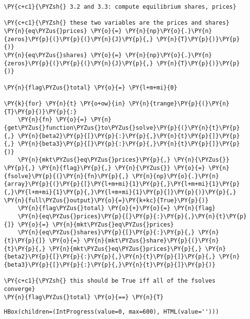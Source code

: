     \begin{tcolorbox}[breakable, size=fbox, boxrule=1pt, pad at break*=1mm,colback=cellbackground, colframe=cellborder]
\begin{Verbatim}[commandchars=\\\{\}]
\PY{c+c1}{\PYZsh{} 3.2 and 3.3: compute equilibrium shares, prices}

\PY{c+c1}{\PYZsh{} these two variables are the prices and shares}
\PY{n}{eq\PYZus{}prices} \PY{o}{=} \PY{n}{np}\PY{o}{.}\PY{n}{zeros}\PY{p}{(}\PY{p}{(}\PY{n}{J}\PY{p}{,} \PY{n}{T}\PY{p}{)}\PY{p}{)}
\PY{n}{eq\PYZus{}shares} \PY{o}{=} \PY{n}{np}\PY{o}{.}\PY{n}{zeros}\PY{p}{(}\PY{p}{(}\PY{n}{J}\PY{p}{,} \PY{n}{T}\PY{p}{)}\PY{p}{)}

\PY{n}{flag\PYZus{}total} \PY{o}{=} \PY{l+m+mi}{0}

\PY{k}{for} \PY{n}{t} \PY{o+ow}{in} \PY{n}{trange}\PY{p}{(}\PY{n}{T}\PY{p}{)}\PY{p}{:}
    \PY{n}{fn} \PY{o}{=} \PY{n}{get\PYZus{}function\PYZus{}to\PYZus{}solve}\PY{p}{(}\PY{n}{t}\PY{p}{,} \PY{n}{beta2}\PY{p}{[}\PY{p}{:}\PY{p}{,}\PY{n}{t}\PY{p}{]}\PY{p}{,} \PY{n}{beta3}\PY{p}{[}\PY{p}{:}\PY{p}{,}\PY{n}{t}\PY{p}{]}\PY{p}{)}
    \PY{n}{mkt\PYZus{}eq\PYZus{}prices}\PY{p}{,} \PY{n}{\PYZus{}} \PY{p}{,} \PY{n}{flag}\PY{p}{,} \PY{n}{\PYZus{}} \PY{o}{=} \PY{n}{fsolve}\PY{p}{(}\PY{n}{fn}\PY{p}{,} \PY{n}{np}\PY{o}{.}\PY{n}{array}\PY{p}{(}\PY{p}{[}\PY{l+m+mi}{1}\PY{p}{,}\PY{l+m+mi}{1}\PY{p}{,}\PY{l+m+mi}{1}\PY{p}{,}\PY{l+m+mi}{1}\PY{p}{]}\PY{p}{)}\PY{p}{,} \PY{n}{full\PYZus{}output}\PY{o}{=}\PY{k+kc}{True}\PY{p}{)}
    \PY{n}{flag\PYZus{}total} \PY{o}{+}\PY{o}{=} \PY{n}{flag}
    \PY{n}{eq\PYZus{}prices}\PY{p}{[}\PY{p}{:}\PY{p}{,}\PY{n}{t}\PY{p}{]} \PY{o}{=} \PY{n}{mkt\PYZus{}eq\PYZus{}prices}
    \PY{n}{eq\PYZus{}shares}\PY{p}{[}\PY{p}{:}\PY{p}{,} \PY{n}{t}\PY{p}{]} \PY{o}{=} \PY{n}{mkt\PYZus{}share}\PY{p}{(}\PY{n}{t}\PY{p}{,} \PY{n}{mkt\PYZus{}eq\PYZus{}prices}\PY{p}{,} \PY{n}{beta2}\PY{p}{[}\PY{p}{:}\PY{p}{,}\PY{n}{t}\PY{p}{]}\PY{p}{,} \PY{n}{beta3}\PY{p}{[}\PY{p}{:}\PY{p}{,}\PY{n}{t}\PY{p}{]}\PY{p}{)}

\PY{c+c1}{\PYZsh{} this should be True iff all of the fsolves converge}
\PY{n}{flag\PYZus{}total} \PY{o}{==} \PY{n}{T}
\end{Verbatim}
\end{tcolorbox}


    \begin{verbatim}
HBox(children=(IntProgress(value=0, max=600), HTML(value='')))
    \end{verbatim}


